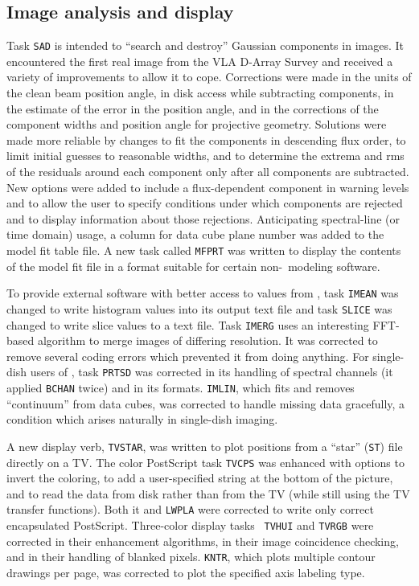 \subsection{Image analysis and display}

Task {\tt SAD} is intended to ``search and destroy'' Gaussian
components in images.  It encountered the first real image from the
VLA D-Array Survey and received a variety of improvements to allow it
to cope.  Corrections were made in the units of the clean beam
position angle, in disk access while subtracting components, in the
estimate of the error in the position angle, and in the corrections of
the component widths and position angle for projective geometry.
Solutions were made more reliable by changes to fit the components in
descending flux order, to limit initial guesses to reasonable widths,
and to determine the extrema and rms of the residuals around each
component only after all components are subtracted.  New options were
added to include a flux-dependent component in warning levels and to
allow the user to specify conditions under which components are
rejected and to display information about those rejections.
Anticipating spectral-line (or time domain) usage, a column for data
cube plane number was added to the model fit table file.  A new task
called {\tt MFPRT} was written to display the contents of the model
fit file in a format suitable for certain non-\AIPS\ modeling
software.

To provide external software with better access to values from \AIPS,
task {\tt IMEAN} was changed to write histogram values into its output
text file and task {\tt SLICE} was changed to write slice values to a
text file.  Task {\tt IMERG} uses an interesting FFT-based algorithm
to merge images of differing resolution.  It was corrected to remove
several coding errors which prevented it from doing anything.  For
single-dish users of \AIPS, task {\tt PRTSD} was corrected in its
handling of spectral channels (it applied {\tt BCHAN} twice) and in
its formats.  {\tt IMLIN}, which fits and removes ``continuum'' from
data cubes, was corrected to handle missing data gracefully, a
condition which arises naturally in single-dish imaging.

A new display verb, {\tt TVSTAR}, was written to plot positions from a
``star'' ({\tt ST}) file directly on a TV.  The color PostScript task
{\tt TVCPS} was enhanced with options to invert the coloring, to add a
user-specified string at the bottom of the picture, and to read the
data from disk rather than from the TV (while still using the TV
transfer functions).  Both it and {\tt LWPLA} were corrected to write
only correct encapsulated PostScript.  Three-color display tasks {\tt
TVHUI} and {\tt TVRGB} were corrected in their enhancement algorithms,
in their image coincidence checking, and in their handling of blanked
pixels.  {\tt KNTR}, which plots multiple contour drawings per page,
was corrected to plot the specified axis labeling type.

